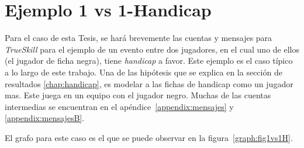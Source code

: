 \documentclass[11pt,twoside,spanish]{report} %
\begin{document}

\section{Ejemplo 1 vs 1-Handicap}

Para el caso de esta Tesis, se har\'a brevemente las cuentas y mensajes para \textit{TrueSkill} para el ejemplo de un evento entre dos jugadores, en el cual uno de ellos (el jugador de ficha negra), tiene \textit{handicap} a favor.
Este ejemplo es el caso t\'ipico a lo largo de este trabajo.
Una de las hip\'otesis que se explica en la secci\'on de resultados \ref{chap:handicap}, es modelar a las fichas de handicap como un jugador mas.
Este juega en un equipo con el jugador negro.
Muchas de las cuentas intermedias se encuentran en el ap\'endice~\ref{appendix:mensajes} y \ref{appendix:mensajesB}.

El grafo para este caso es el que se puede observar en la figura~\ref{graph:fig1vs1H}.
\end{document}
